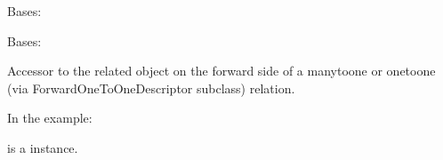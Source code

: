 \documentclass[letterpaper,10pt,english]{sphinxmanual}
\begin{document}
\begin{fulllineitems}
\begin{fulllineitems}
\label{\detokenize{pages_app.models:pages_app.models.PageBlock.DoesNotExist}}
\pysigstartsignatures
\pysigline
{}
\pysigstopsignatures
\sphinxAtStartPar
Bases: 

\end{fulllineitems}


\begin{fulllineitems}
\label{\detokenize{pages_app.models:pages_app.models.PageBlock.MultipleObjectsReturned}}
\pysigstartsignatures
\pysigline
{}
\pysigstopsignatures
\sphinxAtStartPar
Bases: 

\end{fulllineitems}


\begin{fulllineitems}
\label{\detokenize{pages_app.models:id41}}
\pysigstartsignatures
\pysigline
{}
\pysigstopsignatures
\sphinxAtStartPar
Accessor to the related object on the forward side of a many\sphinxhyphen{}to\sphinxhyphen{}one or
one\sphinxhyphen{}to\sphinxhyphen{}one (via ForwardOneToOneDescriptor subclass) relation.

\sphinxAtStartPar
In the example:

\begin{sphinxVerbatim}[commandchars=\\\{\}]
 
       
\end{sphinxVerbatim}

\sphinxAtStartPar
{} is a  instance.

\end{fulllineitems}


\end{fulllineitems}
\end{document}
